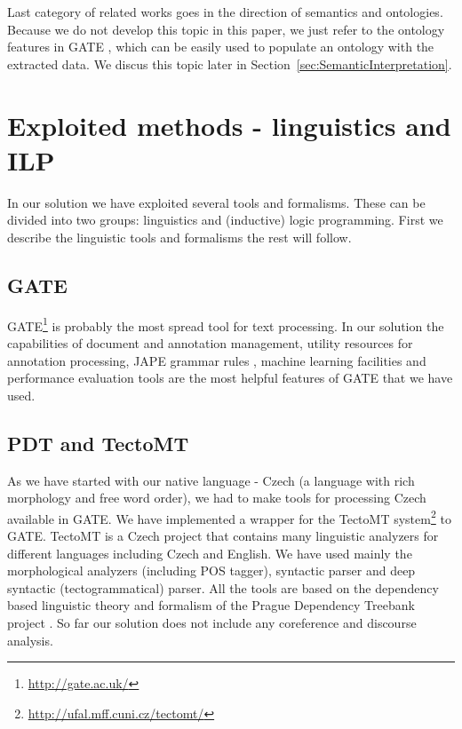 \documentclass[runningheads,a4paper]{llncs}
\begin{document}
Last category of related works goes in the direction of semantics and ontologies. Because we do not develop this topic in this paper, we just refer to the ontology features in GATE \cite{Bon04b}, which can be easily used to populate an ontology with the extracted data. We discus this topic later in Section~\ref{sec:SemanticInterpretation}.




\section{Exploited methods - linguistics and ILP}
In our solution we have exploited several tools and formalisms. These can be divided into two groups: linguistics and (inductive) logic programming. First we describe the linguistic tools and formalisms the rest will follow.

\subsection{GATE}
GATE\footnote{\url{http://gate.ac.uk/}} is probably the most spread tool for text processing. In our solution the capabilities of document and annotation management, utility resources for annotation processing, JAPE grammar rules \cite{Cunningham00jape:a}, machine learning facilities and performance evaluation tools are the most helpful features of GATE that we have used.

\subsection{PDT and TectoMT}
As we have started with our native language - Czech (a language with rich morphology and free word order), we had to make tools for processing Czech available in GATE. We have implemented a wrapper for the TectoMT system\footnote{\url{http://ufal.mff.cuni.cz/tectomt/}} \cite{dedek:ZaPtTectoMTHighly2008} to GATE. TectoMT is a Czech project that contains many linguistic analyzers for different languages including Czech and English. We have used mainly the morphological analyzers (including POS tagger), syntactic parser and deep syntactic (tectogrammatical) parser. All the tools are based on the dependency based linguistic theory and formalism of the Prague Dependency Treebank project \cite{dedek:PDT20_CD}. So far our solution does not include any coreference and discourse analysis.
\end{document}

